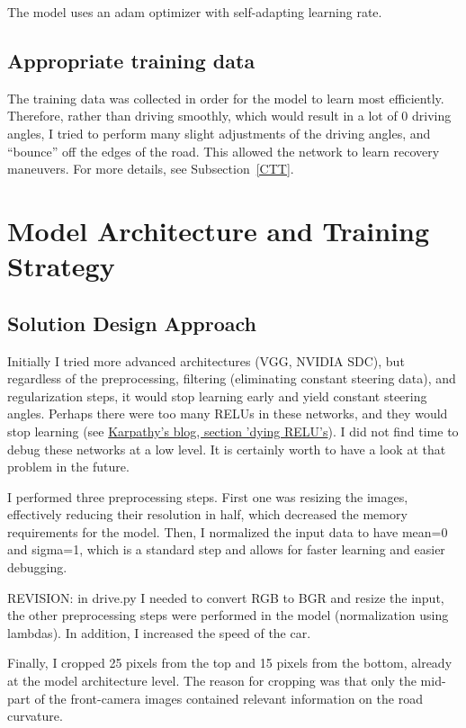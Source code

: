 \documentclass[a4paper,10pt]{article}
\begin{document}
The model uses an adam optimizer with self-adapting learning rate.

\subsection{Appropriate training data}

The training data was collected in order for the model to learn most efficiently.
Therefore, rather than driving smoothly, which would result in a lot of 0 driving angles, 
I tried to perform many slight adjustments of the driving angles, and ``bounce'' off the edges of the road.
This allowed the network to learn recovery maneuvers.
For more details, see Subsection~\ref{CTT}.

\section{Model Architecture and Training Strategy}

\subsection{Solution Design Approach}

Initially I tried more advanced architectures (VGG, NVIDIA SDC), 
but regardless of the preprocessing, filtering (eliminating constant steering data), and regularization steps,
it would stop learning early and yield constant steering angles. Perhaps there were too many RELUs in these networks,
and they would stop learning (see \href{https://medium.com/@karpathy/yes-you-should-understand-backprop-e2f06eab496b}{Karpathy's blog, section 'dying RELU's}).
I did not find time to debug these networks at a low level. 
It is certainly worth to have a look at that problem in the future.

I performed three preprocessing steps.
First one was resizing the images, effectively reducing their resolution in half, which decreased the memory requirements for the model.
Then, I normalized the input data to have mean=0 and sigma=1, which is a standard step and allows for faster learning and easier debugging.

REVISION: in drive.py I needed to convert RGB to BGR and resize the input, the other preprocessing steps were performed in the model (normalization using lambdas).
In addition, I increased the speed of the car.

Finally, I cropped 25 pixels from the top and 15 pixels from the bottom, already at the model architecture level.
The reason for cropping was that only the mid-part of the front-camera images contained relevant information on the road curvature.
\end{document}
